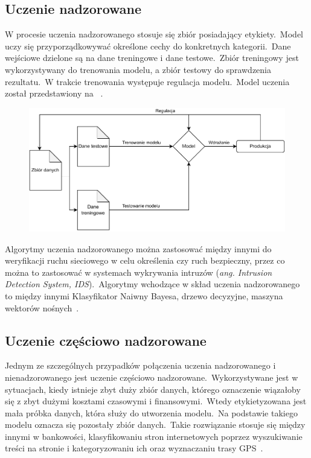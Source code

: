 \subsection{Uczenie nadzorowane}
W procesie uczenia nadzorowanego stosuje się zbiór posiadający etykiety.\ Model uczy się przyporządkowywać określone cechy do konkretnych kategorii.\ Dane wejściowe dzielone są na dane treningowe i dane testowe.\ Zbiór treningowy jest wykorzystywany do trenowania modelu, a zbiór testowy do sprawdzenia rezultatu.\ W trakcie trenowania występuje regulacja modelu.\ Model uczenia został przedstawiony na ~\cite{AiScience, Mahesh2018}.

\begin{figure}[H]
    \centering
    \includegraphics[width=1\textwidth]{images/supervised}
    \label{fig:spervised}
\end{figure}

Algorytmy uczenia nadzorowanego można zastosować między innymi do weryfikacji ruchu sieciowego w celu określenia czy ruch bezpieczny, przez co można to zastosować w systemach wykrywania intruzów (\textit{ang. Intrusion Detection System, IDS}).\ Algorytmy wchodzące w skład uczenia nadzorowanego to między innymi Klasyfikator Naiwny Bayesa, drzewo decyzyjne, maszyna wektorów nośnych~\cite{AiScience, Mahesh2018}.

\subsection{Uczenie częściowo nadzorowane}
Jednym ze szczególnych przypadków połączenia uczenia nadzorowanego i nienadzorowanego jest uczenie częściowo nadzorowane.\ Wykorzystywane jest w sytuacjach, kiedy istnieje zbyt duży zbiór danych, którego oznaczenie wiązałoby się z zbyt dużymi kosztami czasowymi i finansowymi.\ Wtedy etykietyzowana jest mała próbka danych, która służy do utworzenia modelu.\ Na podstawie takiego modelu oznacza się pozostały zbiór danych.\ Takie rozwiązanie stosuje się między innymi w bankowości, klasyfikowaniu stron internetowych poprzez wyszukiwanie treści na stronie i kategoryzowaniu ich oraz wyznaczaniu trasy GPS~\cite{semiLinkedin, Mahesh2018}.

